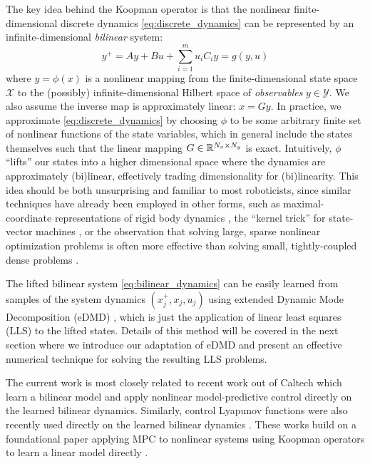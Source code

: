 \documentclass{article}
\begin{document}
The key idea behind the Koopman operator is that the nonlinear finite-dimensional discrete
dynamics \eqref{eq:discrete_dynamics} can be represented by an infinite-dimensional
\textit{bilinear} system:
\begin{equation} \label{eq:bilinear_dynamics}
  y^+ = A y + B u + \sum_{i=1}^m u_i C_i y = g(y,u)
\end{equation}
where $y = \phi(x)$ is a nonlinear mapping from the finite-dimensional state space
$\mathcal{X}$ to the (possibly) infinite-dimensional Hilbert space of \textit{observables}
$y \in \mathcal{Y}$. We also assume the inverse map is approximately linear: $x = G y$. In
practice, we approximate \eqref{eq:discrete_dynamics} by choosing $\phi$ to be some
arbitrary finite set of nonlinear functions of the state variables, which in general
include the states themselves such that the linear mapping $G \in \mathbb{R}^{N_x \times N_y}$ is
exact.  Intuitively, $\phi$ ``lifts'' our states into a higher dimensional space where the
dynamics are approximately (bi)linear, effectively trading dimensionality for
(bi)linearity. This idea should be both unsurprising and familiar to most roboticists,
since similar techniques have already been employed in other forms, such as
maximal-coordinate representations of rigid body dynamics
\cite{Baraff,Brudigam2021a,Howell2022}, the
``kernel trick'' for state-vector machines \cite{Hofmann2006}, or the observation that
solving large, sparse nonlinear optimization problems is often more effective than solving
small, tightly-coupled dense problems .

The lifted bilinear system \eqref{eq:bilinear_dynamics} can be easily learned from samples
of the system dynamics $(x_j^+,x_j,u_j)$ using extended Dynamic Mode Decomposition (eDMD)
\cite{Williams2015}, which is just the application of linear least squares (LLS) to the
lifted states. Details of this method will be covered in the next section where we
introduce our adaptation of eDMD and present an effective numerical technique for solving
the resulting LLS problems.

The current work is most closely related to recent work out of Caltech 
\cite{Folkestad2020,Folkestad2021,Folkestad2021a} which learn a bilinear
model and apply nonlinear model-predictive control directly on the learned bilinear 
dynamics. Similarly, control Lyapunov functions were also recently used directly on the 
learned bilinear dynamics \cite{Narasingam2022}. These works build on a foundational paper
applying MPC to nonlinear systems using Koopman operators to learn a linear model directly
\cite{Korda2018}.
\end{document}
